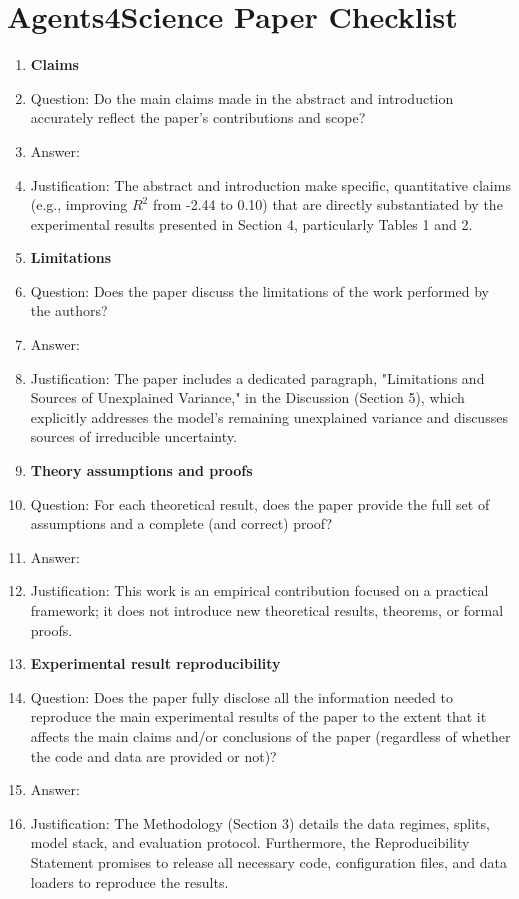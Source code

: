 ﻿\documentclass{article}
\begin{document}
\section*{Agents4Science Paper Checklist}
\begin{enumerate}

\item {\bf Claims}
    \item[] Question: Do the main claims made in the abstract and introduction accurately reflect the paper's contributions and scope?
    \item[] Answer: \answerYes{}
    \item[] Justification: The abstract and introduction make specific, quantitative claims (e.g., improving $R^2$ from -2.44 to 0.10) that are directly substantiated by the experimental results presented in Section 4, particularly Tables 1 and 2.

\item {\bf Limitations}
    \item[] Question: Does the paper discuss the limitations of the work performed by the authors?
    \item[] Answer: \answerYes{}
    \item[] Justification: The paper includes a dedicated paragraph, "Limitations and Sources of Unexplained Variance," in the Discussion (Section 5), which explicitly addresses the model's remaining unexplained variance and discusses sources of irreducible uncertainty.

\item {\bf Theory assumptions and proofs}
    \item[] Question: For each theoretical result, does the paper provide the full set of assumptions and a complete (and correct) proof?
    \item[] Answer: \answerNA{}
    \item[] Justification: This work is an empirical contribution focused on a practical framework; it does not introduce new theoretical results, theorems, or formal proofs.

    \item {\bf Experimental result reproducibility}
    \item[] Question: Does the paper fully disclose all the information needed to reproduce the main experimental results of the paper to the extent that it affects the main claims and/or conclusions of the paper (regardless of whether the code and data are provided or not)?
    \item[] Answer: \answerYes{}
    \item[] Justification: The Methodology (Section 3) details the data regimes, splits, model stack, and evaluation protocol. Furthermore, the Reproducibility Statement promises to release all necessary code, configuration files, and data loaders to reproduce the results.


\end{enumerate}
\end{document}
